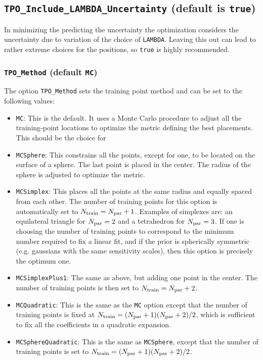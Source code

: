 \documentclass[UserManual.tex]{subfiles}
\begin{document}
\begin{sloppypar}
\subsection{{\tt TPO\_Include\_LAMBDA\_Uncertainty} (default is {\tt true})}
In minimizing the predicting the uncertainty the optimization considers the uncertainty due to variation of the choice of {\tt LAMBDA}. Leaving this out can lead to rather extreme choices for the positions, so {\tt true} is highly recommended.
\subsubsection{{\tt TPO\_Method} (default {\tt MC})}
The option {\tt TPO\_Method} sets the training point method and can be set to the following values:
\begin{itemize}\itemsep 0pt
\item {\tt MC}: This is the default. It uses a Monte Carlo procedure to adjust all the training-point locations to optimize the metric defining the best placements. This should be the choice for 
\item {\tt MCSphere}: This constrains all the points, except for one, to be located on the surface of a sphere. The last point is placed in the center. The radius of the sphere is adjusted to optimize the metric.
\item {\tt MCSimplex}: This places all the points at the same radius and equally spaced from each other. The number of training points for this option is automatically set to $N_{\rm train}=N_{\rm par}+1$. Examples of simplexes are: an equilateral triangle for $N_{\rm par}=2$ and a tetrahedron for $N_{\rm par}=3$. If one is choosing the number of training points to correspond to the minimum number required to fix a linear fit, and if the prior is spherically symmetric (e.g. gaussians with the same sensitivity scales), then this option is precisely the optimum one.
\item {\tt MCSimplexPlus1}: The same as above, but adding one point in the center. The number of training points is then set to $N_{\rm train}=N_{\rm par}+2$. 
\item {\tt MCQuadratic}: This is the same as the {\tt MC} option except that the number of training points is fixed at $N_{\rm train}=(N_{\rm par}+1)(N_{\rm par}+2)/2$, which is sufficient to fix all the coefficients in a quadratic expansion.
\item {\tt MCSphereQuadratic}: This is the same as {\tt MCSphere}, except that the number of training points is set to $N_{\rm train}=(N_{\rm par}+1)(N_{\rm par}+2)/2$.
\end{itemize}


\end{sloppypar}
\end{document}
